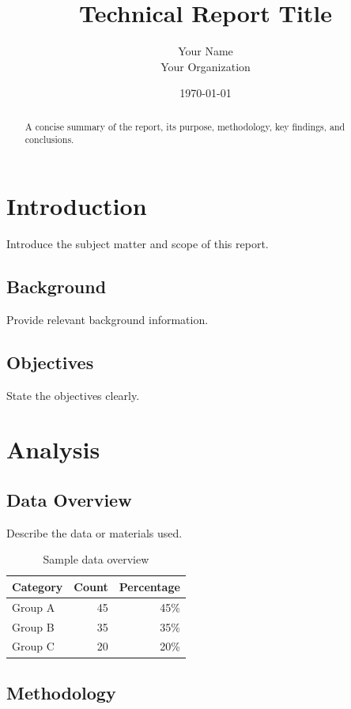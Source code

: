 \documentclass[12pt]{report}
\title{Technical Report Title}
\author{Your Name \\ \small Your Organization}
\date{\today}
\begin{document}
\maketitle

\begin{abstract}
  A concise summary of the report, its purpose,
  methodology, key findings, and conclusions.
\end{abstract}

\tableofcontents

\chapter{Introduction}

Introduce the subject matter and scope of this report.

\section{Background}
Provide relevant background information.

\section{Objectives}
State the objectives clearly.

\chapter{Analysis}

\section{Data Overview}

Describe the data or materials used.

\begin{table}[h]
  \centering
  \caption{Sample data overview}
  \begin{tabular}{lrr}
    \toprule
    Category & Count & Percentage \\
    \midrule
    Group A & 45 & 45\% \\
    Group B & 35 & 35\% \\
    Group C & 20 & 20\% \\
    \bottomrule
  \end{tabular}
\end{table}

\section{Methodology}
\end{document}
